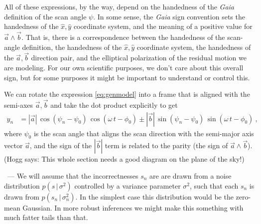 \documentclass{article}
\renewcommand{\paragraph}[1]{\medskip\par\noindent{\textbf{#1}}~---}
\newcommand{\given}{\,|\,}
\newcommand{\hoggsay}[1]{{\color{blue} (Hogg says: #1)}}
\begin{document}
All of these expressions, by the way, depend on the handedness of the \textsl{Gaia} definition of the scan angle $\psi$.
In some sense, the \textsl{Gaia} sign convention sets the handedness of the $\hat{x},\hat{y}$ coordinate system,
and the meaning of a positive value for $\vec{a}\wedge\vec{b}$.
That is, there is a correspondence between the handedness of the scan-angle definition, the handedness of the $\hat{x},\hat{y}$ coordinate system,
the handedness of the $\vec{a},\vec{b}$ direction pair, and the elliptical polarization of the residual motion we are modeling.
For our own scientific purposes, we don't care about this overall sign, but for some purposes it might be important to understand or control this.

We can rotate the expression \eqref{eq:genmodel} into a frame that is aligned with the semi-axes $\vec{a},\vec{b}$ and take the dot product explicitly to get
\begin{align}
    y_n &= |\vec{a}|\,\cos(\psi_n-\psi_0)\,\cos(\omega\,t-\phi_0) \pm |\vec{b}|\,\sin(\psi_n-\psi_0)\,\sin(\omega\,t-\phi_0) ~,
\end{align}
where $\psi_0$ is the scan angle that aligns the scan direction with the semi-major axis vector $\vec{a}$,
and the sign of the $|\vec{b}|$ term is related to the parity (the sign of $\vec{a}\wedge\vec{b}$). \hoggsay{This whole section needs a good diagram on the plane of the sky!}

\paragraph{Noise and robustness}
We will assume that the incorrectnesses $s_n$ are are drawn from a noise distribution $p(s\given\sigma^2)$ controlled by a variance parameter $\sigma^2$, such that each $s_n$ is drawn from $p(s_n\given\sigma^2_n)$.
In the simplest case this distribution would be the zero-mean Gaussian.
In more robust inferences we might make this something with much fatter tails than that.
\end{document}
